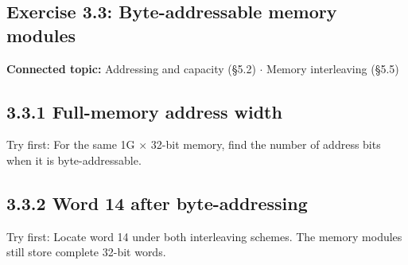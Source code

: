 \documentclass[11pt]{article}
\begin{document}
\begin{keepsection}
\section{Exercise 3.3: Byte-addressable memory modules}

\textbf{Connected topic:} Addressing and capacity (§5.2) \ensuremath{\cdot} Memory interleaving (§5.5)

\begin{keepsection}
\subsection{3.3.1 Full-memory address width}

Try first: For the same 1G \ensuremath{\times} 32-bit memory, find the number of address bits when it is byte-addressable.

\end{keepsection}

\begin{keepsection}
\subsection{3.3.2 Word 14 after byte-addressing}

Try first: Locate word 14 under both interleaving schemes. The memory modules still store complete 32-bit words.

\end{keepsection}
\end{keepsection}
\end{document}
